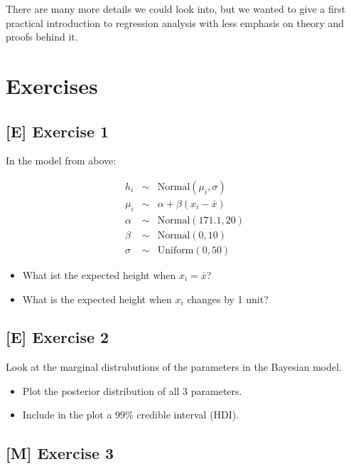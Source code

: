 \documentclass[
]{book}
\providecommand{\tightlist}{%
  \setlength{\itemsep}{0pt}\setlength{\parskip}{0pt}}
\begin{document}
There are many more details we could look into, but we wanted to give a first
practical introduction to regression analysis with less emphasis on theory and proofs behind it.

\section{Exercises}\label{exercises-1}

\subsection{{[}E{]} Exercise 1}\label{exercise1_simpl_lin_reg}

In the model from above:

\begin{eqnarray*}
h_i &\sim& \text{Normal}(\mu_i, \sigma)\\
\mu_i &\sim& \alpha + \beta (x_i - \bar{x})\\
\alpha &\sim& \text{Normal}(171.1, 20)\\
\beta &\sim& \text{Normal}(0, 10)\\
\sigma &\sim& \text{Uniform}(0, 50)
\end{eqnarray*}

\begin{itemize}
\tightlist
\item
  What ist the expected height when \(x_i = \bar{x}\)?
\item
  What is the expected height when \(x_i\) changes by 1 unit?
\end{itemize}

\subsection{{[}E{]} Exercise 2}\label{exercise2_simpl_lin_reg}

Look at the marginal distrubutions of the parameters in the Bayesian model.

\begin{itemize}
\tightlist
\item
  Plot the posterior distribution of all 3 parameters.
\item
  Include in the plot a 99\% credible interval (HDI).
\end{itemize}

\subsection{{[}M{]} Exercise 3}\label{exercise3_simpl_lin_reg}
\end{document}
